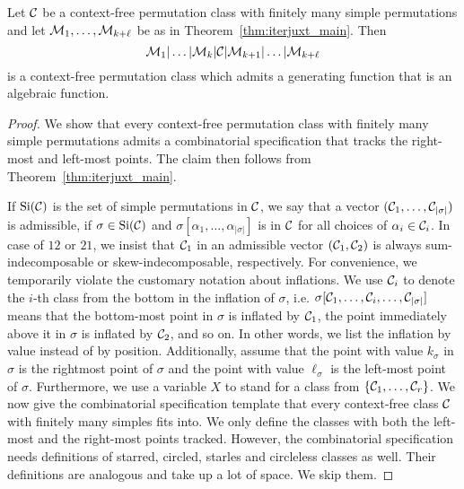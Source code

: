 \documentclass[12pt, a4paper, twoside]{report}
\begin{document}
\begin{corollary}
 Let $\mathcal{C}$ be a context-free permutation class with finitely many simple permutations and let $\mathcal{M}_1,\ldots,\mathcal{M}_{k+\ell}$ be as in Theorem~\ref{thm:iterjuxt_main}. Then
 $$\mathcal{M}_1|\ldots|\mathcal{M}_k|\mathcal{C}|\mathcal{M}_{k+1}|\ldots|\mathcal{M}_{k+\ell}$$
 is a context-free permutation class which admits a generating function that is an algebraic function.
\label{cor:finmanysimples}
\end{corollary}
\begin{proof}
  We show that every context-free permutation class with finitely many simple permutations admits a combinatorial specification that tracks the right-most and left-most points. The claim then follows from Theorem~\ref{thm:iterjuxt_main}.

  If $\mathrm{Si}(\mathcal{C})$ is the set of simple permutations in $\mathcal{C}$, we say that a vector $(\mathcal{C}_1,\ldots,\mathcal{C}_{|\sigma|})$ is admissible, if $\sigma \in \mathrm{Si}(\mathcal{C})$ and $\sigma[\alpha_1,\ldots,\alpha_{|\sigma|}]$ is in $\mathcal{C}$ for all choices of $\alpha_i\in\mathcal{C}_i$. In case of $12$ or $21$, we insist that $\mathcal{C}_1$ in an admissible vector $(\mathcal{C}_1,\mathcal{C}_2)$ is always sum-indecomposable or skew-indecomposable, respectively. For convenience, we temporarily violate the customary notation about inflations. We use $\mathcal{C}_i$ to denote the $i$-th class from the bottom in the inflation of $\sigma$, i.e. $\sigma[\mathcal{C}_1,\ldots,\mathcal{C}_i,\ldots,\mathcal{C}_{|\sigma|}]$ means that the bottom-most point in $\sigma$ is inflated by $\mathcal{C}_1$, the point immediately above it in $\sigma$ is inflated by $\mathcal{C}_2$, and so on. In other words, we list the inflation by value instead of by position. Additionally, assume that the point with value $k_\sigma$ in $\sigma$ is the rightmost point of $\sigma$ and the point with value $\ell_\sigma$ is the left-most point of $\sigma$. Furthermore, we use a variable $X$ to stand for a class from $\{\mathcal{C}_1,\ldots,\mathcal{C}_r\}$. We now give the combinatorial specification template that every context-free class $\mathcal{C}$ with finitely many simples fits into. We only define the classes with both the left-most and the right-most points tracked. However, the combinatorial specification needs definitions of starred, circled, starles and circleless classes as well. Their definitions are analogous and take up a lot of space. We skip them.


\end{proof}
\end{document}
